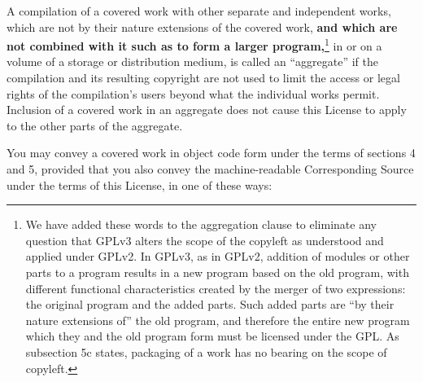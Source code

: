 \documentclass[11pt]{article}
\newcounter{v2section}
\newcounter{v3section}
\begin{document}
A compilation of a covered work with other separate and independent
works, which are not by their nature extensions of the covered work,
\textbf{and which are not combined with it such as to form a
larger program,}\footnote{We have added these words to the aggregation
clause to eliminate any question that GPLv3 alters the scope of the
copyleft as understood and applied under GPLv2. In GPLv3, as in GPLv2,
addition of modules or other parts to a program results in a new program
based on the old program, with different functional characteristics
created by the merger of two expressions: the original program and the
added parts.  Such added parts are ``by their nature extensions of'' the
old program, and therefore the entire new program which they and the old
program form must be licensed under the GPL.  As subsection 5c states,
packaging of a work has no bearing on the scope of copyleft.} in or on a
volume of a storage or distribution medium, is called an ``aggregate''
if the compilation and its resulting copyright are not used to limit the
access or legal rights of the compilation's users beyond what the
individual works permit.  Inclusion of a covered work in an aggregate
does not cause this License to apply to the other parts of the
aggregate.


  You may convey a covered work in object code form under the terms of
sections 4 and 5, provided that you also convey the machine-readable
Corresponding Source under the terms of this License, in one of these
ways:
\end{document}
